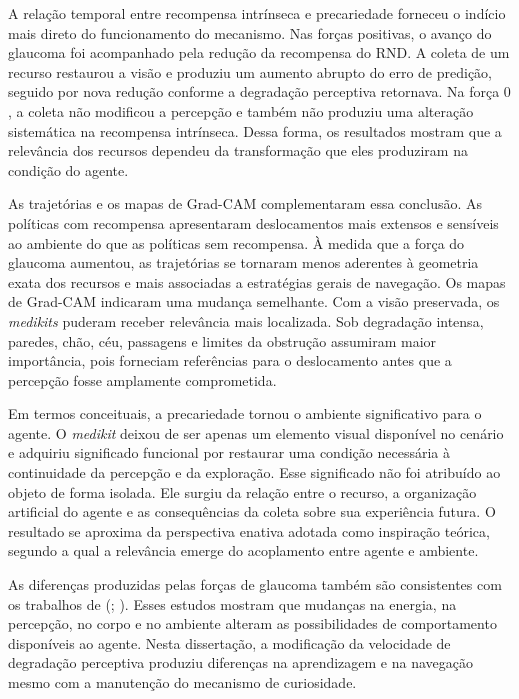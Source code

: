 A relação temporal entre recompensa intrínseca e precariedade forneceu o indício mais direto do funcionamento do mecanismo. Nas forças positivas, o avanço do glaucoma foi acompanhado pela redução da recompensa do RND. A coleta de um recurso restaurou a visão e produziu um aumento abrupto do erro de predição, seguido por nova redução conforme a degradação perceptiva retornava. Na força $0$, a coleta não modificou a percepção e também não produziu uma alteração sistemática na recompensa intrínseca. Dessa forma, os resultados mostram que a relevância dos recursos dependeu da transformação que eles produziram na condição do agente.

As trajetórias e os mapas de Grad-CAM complementaram essa conclusão. As políticas com recompensa apresentaram deslocamentos mais extensos e sensíveis ao ambiente do que as políticas sem recompensa. À medida que a força do glaucoma aumentou, as trajetórias se tornaram menos aderentes à geometria exata dos recursos e mais associadas a estratégias gerais de navegação. Os mapas de Grad-CAM indicaram uma mudança semelhante. Com a visão preservada, os \textit{medikits} puderam receber relevância mais localizada. Sob degradação intensa, paredes, chão, céu, passagens e limites da obstrução assumiram maior importância, pois forneciam referências para o deslocamento antes que a percepção fosse amplamente comprometida.

Em termos conceituais, a precariedade tornou o ambiente significativo para o agente. O \textit{medikit} deixou de ser apenas um elemento visual disponível no cenário e adquiriu significado funcional por restaurar uma condição necessária à continuidade da percepção e da exploração. Esse significado não foi atribuído ao objeto de forma isolada. Ele surgiu da relação entre o recurso, a organização artificial do agente e as consequências da coleta sobre sua experiência futura. O resultado se aproxima da perspectiva enativa adotada como inspiração teórica, segundo a qual a relevância emerge do acoplamento entre agente e ambiente.

As diferenças produzidas pelas forças de glaucoma também são consistentes com os trabalhos de  (\citeyear{yuri-ambiente-rico}; \citeyear{yuri-sem-objetivo}). Esses estudos mostram que mudanças na energia, na percepção, no corpo e no ambiente alteram as possibilidades de comportamento disponíveis ao agente. Nesta dissertação, a modificação da velocidade de degradação perceptiva produziu diferenças na aprendizagem e na navegação mesmo com a manutenção do mecanismo de curiosidade.

